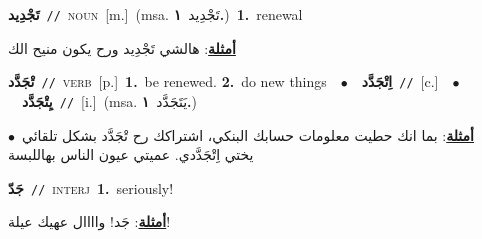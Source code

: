 \documentclass[10pt,a4paper,twoside]{article} %
\begin{document}
\begin{multicols}{2}
{\setlength\topsep{0pt}\textbf{\foreignlanguage{arabic}{تَجْدِيد}}\ {\color{gray}\texttt{//}\color{black}}\ \textsc{noun}\ [m.]\ \color{gray}(msa. \foreignlanguage{arabic}{تَجْدِيد}~\foreignlanguage{arabic}{\textbf{١.}})\color{black}\ \textbf{1.}~renewal\  \begin{flushright}\color{gray}\foreignlanguage{arabic}{\textbf{\underline{\foreignlanguage{arabic}{أمثلة}}}: هالشي تَجْدِيد ورح يكون منيح الك}\end{flushright}\color{black}} \vspace{2mm}

{\setlength\topsep{0pt}\textbf{\foreignlanguage{arabic}{تْجَدَّد}}\ {\color{gray}\texttt{//}\color{black}}\ \textsc{verb}\ [p.]\ \textbf{1.}~be renewed.  \textbf{2.}~do new things\ \ $\bullet$\ \ \setlength\topsep{0pt}\textbf{\foreignlanguage{arabic}{اِتْجَدَّد}}\ {\color{gray}\texttt{//}\color{black}}\ [c.]\ \ $\bullet$\ \ \setlength\topsep{0pt}\textbf{\foreignlanguage{arabic}{يِتْجَدَّد}}\ {\color{gray}\texttt{//}\color{black}}\ [i.]\ \color{gray}(msa. \foreignlanguage{arabic}{يَتَجَدَّد}~\foreignlanguage{arabic}{\textbf{١.}})\color{black}\  \begin{flushright}\color{gray}\foreignlanguage{arabic}{\textbf{\underline{\foreignlanguage{arabic}{أمثلة}}}: بما انك حطيت معلومات حسابك البنكي، اشتراكك رح تْجَدَّد بشكل تلقائي\ $\bullet$\ \  يختي اِتْجَدَّدي. عميتي عيون الناس بهاللبسة}\end{flushright}\color{black}} \vspace{2mm}

{\setlength\topsep{0pt}\textbf{\foreignlanguage{arabic}{جَدّ}}\ {\color{gray}\texttt{//}\color{black}}\ \textsc{interj}\ \textbf{1.}~seriously!\  \begin{flushright}\color{gray}\foreignlanguage{arabic}{\textbf{\underline{\foreignlanguage{arabic}{أمثلة}}}: جَد! واااال عهيك عيلة!}\end{flushright}\color{black}} \vspace{2mm}


\end{multicols}
\end{document}
